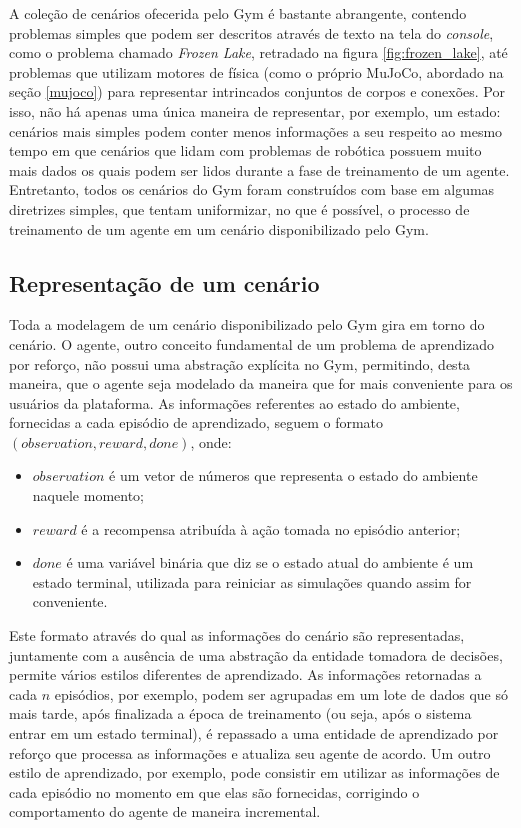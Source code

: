 \documentclass[cic,tc]{iiufrgs}
\begin{document}
A coleção de cenários ofecerida pelo Gym é bastante abrangente, contendo
problemas simples que podem ser descritos através de texto na tela do
\textit{console}, como  o problema chamado \textit{Frozen Lake}, retradado na
figura \ref{fig:frozen_lake}, até problemas que utilizam motores de física (como
o próprio MuJoCo, abordado na seção \ref{mujoco}) para representar intrincados
conjuntos de corpos e conexões. Por isso, não há apenas uma única maneira de
representar, por exemplo, um estado: cenários mais simples podem conter menos
informações a seu respeito ao mesmo tempo em que cenários que lidam com
problemas de robótica possuem muito mais dados os quais podem ser lidos durante
a fase de treinamento de um agente. Entretanto, todos os cenários do Gym foram
construídos com base em algumas diretrizes simples, que tentam uniformizar, no
que é possível, o processo de treinamento de um agente em um cenário
disponibilizado pelo Gym.


\subsection{Representação de um cenário}
Toda a modelagem de um cenário disponibilizado pelo Gym gira em torno do
cenário. O agente, outro conceito fundamental de um problema de aprendizado por
reforço, não possui uma abstração explícita no Gym, permitindo, desta maneira,
que o agente seja modelado da maneira que for mais conveniente para os usuários
da plataforma. As informações referentes ao estado do ambiente, fornecidas a
cada episódio de aprendizado, seguem o formato $(observation, reward, done)$,
onde:

\begin{itemize}
  \item $observation$ é um vetor de números que representa o estado do ambiente
  naquele momento;
  \item $reward$ é a recompensa atribuída à ação tomada no episódio anterior;
  \item $done$ é uma variável binária que diz se o estado atual do ambiente é
  um estado terminal, utilizada para reiniciar as simulações quando assim for
  conveniente.
\end{itemize}

Este formato através do qual as informações do cenário são representadas,
juntamente com a ausência de uma abstração da entidade tomadora de decisões,
permite vários estilos diferentes de aprendizado. As informações retornadas a
cada $n$ episódios, por exemplo, podem ser agrupadas em um lote de dados que só
mais tarde, após finalizada a época de treinamento (ou seja, após o sistema
entrar em um estado terminal), é repassado a uma entidade de aprendizado por
reforço que processa as informações e atualiza seu agente de acordo. Um outro
estilo de aprendizado, por exemplo, pode consistir em utilizar as informações de
cada episódio no momento em que elas são fornecidas, corrigindo o comportamento
do agente de maneira incremental.
\end{document}
